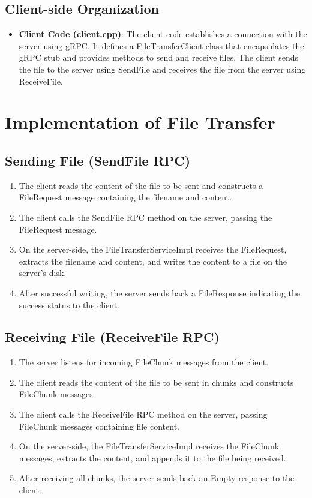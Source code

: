\documentclass{article}
\begin{document}
\subsection{Client-side Organization}
\begin{itemize}
    \item \textbf{Client Code (client.cpp)}: The client code establishes a connection with the server using gRPC. It defines a FileTransferClient class that encapsulates the gRPC stub and provides methods to send and receive files. The client sends the file to the server using SendFile and receives the file from the server using ReceiveFile.
\end{itemize}

\section{Implementation of File Transfer}

\subsection{Sending File (SendFile RPC)}
\begin{enumerate}
    \item The client reads the content of the file to be sent and constructs a FileRequest message containing the filename and content.
    \item The client calls the SendFile RPC method on the server, passing the FileRequest message.
    \item On the server-side, the FileTransferServiceImpl receives the FileRequest, extracts the filename and content, and writes the content to a file on the server's disk.
    \item After successful writing, the server sends back a FileResponse indicating the success status to the client.

\end{enumerate}

\subsection{Receiving File (ReceiveFile RPC)}
\begin{enumerate}
    \item The server listens for incoming FileChunk messages from the client.
    \item The client reads the content of the file to be sent in chunks and constructs FileChunk messages.
    \item The client calls the ReceiveFile RPC method on the server, passing FileChunk messages containing file content.
    \item On the server-side, the FileTransferServiceImpl receives the FileChunk messages, extracts the content, and appends it to the file being received.
    \item After receiving all chunks, the server sends back an Empty response to the client.
\end{enumerate}
\end{document}
